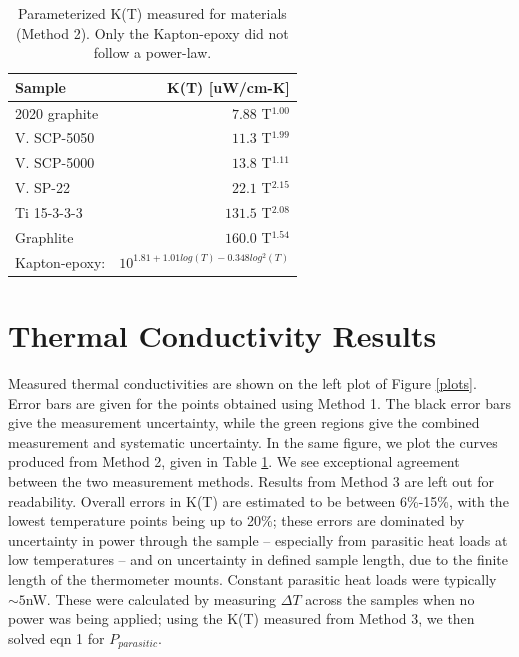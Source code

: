 \documentclass[final]{svjour2}
\begin{document}
\begin{table}
\centering
\begin{threeparttable}
\begin{tabular}{lr}
\toprule
Sample & K(T) [uW/cm-K] \\
\midrule
2020 graphite & $7.88$ T$^{1.00}$ \\
V. SCP-5050 & $11.3$ T$^{1.99}$ \\
V. SCP-5000 & $13.8$ T$^{1.11}$ \\
V. SP-22 & $22.1$ T$^{2.15}$ \\
Ti 15-3-3-3 & $131.5$ T$^{2.08}$ \\
Graphlite & $160.0$ T$^{1.54}$ \\
Kapton-epoxy: & $10^{1.81 + 1.01log(T) - 0.348log^2(T)}$ \\
\bottomrule
\end{tabular}
\end{threeparttable}
\caption{{\small Parameterized K(T) measured for materials (Method 2). Only the Kapton-epoxy did not follow a power-law.}}
\label{cond_table}
\end{table}

\section{Thermal Conductivity Results}
Measured thermal conductivities are shown on the left plot of Figure \ref{plots}. Error bars are given for the points obtained using Method 1. The black error bars give the measurement uncertainty, while the green regions give the combined measurement and systematic uncertainty. In the same figure, we plot the curves produced from Method 2, given in Table \ref{cond_table}. We see exceptional agreement between the two measurement methods. Results from Method 3 are left out for readability. Overall errors in K(T) are estimated to be between 6\%-15\%, with the lowest temperature points being up to 20\%; these errors are dominated by uncertainty in power through the sample -- especially from parasitic heat loads at low temperatures -- and on uncertainty in defined sample length, due to the finite length of the thermometer mounts. Constant parasitic heat loads were typically $\sim 5$nW. These were calculated by measuring $\Delta T$ across the samples when no power was being applied; using the K(T) measured from Method 3, we then solved eqn 1 for $P_{parasitic}$.
\end{document}
